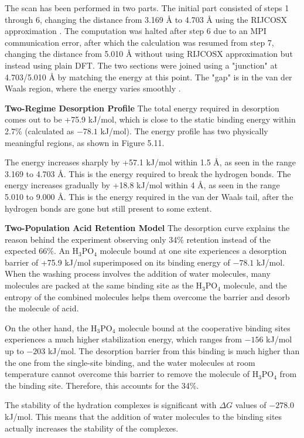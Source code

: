 \documentclass[12pt,a4paper]{report}
\begin{document}
The scan has been performed in two parts. The initial part consisted of steps 1 through 6, changing the distance from 3.169 Å to 4.703 Å using the RIJCOSX approximation \cite{80}. The computation was halted after step 6 due to an MPI communication error, after which the calculation was resumed from step 7, changing the distance from 5.010 Å without using RIJCOSX approximation but instead using plain DFT. The two sections were joined using a "junction" at 4.703/5.010 Å by matching the energy at this point. The "gap" is in the van der Waals region, where the energy varies smoothly \cite{77,78,79}.

\textbf{Two-Regime Desorption Profile}
The total energy required in desorption comes out to be +75.9 kJ/mol, which is close to the static binding energy within 2.7\% (calculated as \(-78.1\) kJ/mol). The energy profile has two physically meaningful regions, as shown in Figure 5.11.

The energy increases sharply by +57.1 kJ/mol within 1.5 Å, as seen in the range 3.169 to 4.703 Å. This is the energy required to break the hydrogen bonds. The energy increases gradually by +18.8 kJ/mol within 4 Å, as seen in the range 5.010 to 9.000 Å. This is the energy required in the van der Waals tail, after the hydrogen bonds are gone but still present to some extent. \cite{73, 74, 97}

\textbf{Two-Population Acid Retention Model}
The desorption curve explains the reason behind the experiment observing only 34\% retention instead of the expected 66\%. An H\(_3\)PO\(_4\) molecule bound at one site experiences a desorption barrier of +75.9 kJ/mol superimposed on its binding energy of \(-78.1\) kJ/mol. When the washing process involves the addition of water molecules, many molecules are packed at the same binding site as the H\(_3\)PO\(_4\) molecule, and the entropy of the combined molecules helps them overcome the barrier and desorb the molecule of acid.\cite{63, 64}

On the other hand, the H\(_3\)PO\(_4\) molecule bound at the cooperative binding sites experiences a much higher stabilization energy, which ranges from \(-156\) kJ/mol up to \(-203\) kJ/mol. The desorption barrier from this binding is much higher than the one from the single-site binding, and the water molecules at room temperature cannot overcome this barrier to remove the molecule of H\(_3\)PO\(_4\) from the binding site. Therefore, this accounts for the 34\%.

The stability of the hydration complexes is significant with \(\Delta G\) values of \(-278.0\) kJ/mol. This means that the addition of water molecules to the binding sites actually increases the stability of the complexes.\cite{61, 64}
\end{document}
